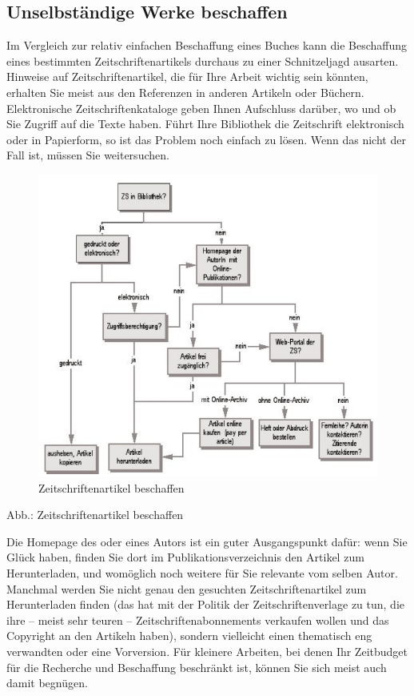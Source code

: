 \documentclass[]{book}
\theoremstyle{definition}
\theoremstyle{definition}
\theoremstyle{definition}
\theoremstyle{remark}
\begin{document}
\subsection{Unselbständige Werke
beschaffen}\label{unselbstandige-werke-beschaffen}

Im Vergleich zur relativ einfachen Beschaffung eines Buches kann die
Beschaffung eines bestimmten Zeitschriftenartikels durchaus zu einer
Schnitzeljagd ausarten. Hinweise auf Zeitschriftenartikel, die für Ihre
Arbeit wichtig sein könnten, erhalten Sie meist aus den Referenzen in
anderen Artikeln oder Büchern. Elektronische Zeitschriftenkataloge geben
Ihnen Aufschluss darüber, wo und ob Sie Zugriff auf die Texte haben.
Führt Ihre Bibliothek die Zeitschrift elektronisch oder in Papierform,
so ist das Problem noch einfach zu lösen. Wenn das nicht der Fall ist,
müssen Sie weitersuchen.

\begin{figure}

{\centering \includegraphics{images/recherchieren-zeitschriften-beschaffen-min} 

}

\caption{Zeitschriftenartikel beschaffen}\label{fig:unnamed-chunk-10}
\end{figure}

Abb.: Zeitschriftenartikel beschaffen

Die Homepage des oder eines Autors ist ein guter Ausgangspunkt dafür:
wenn Sie Glück haben, finden Sie dort im Publikationsverzeichnis den
Artikel zum Herunterladen, und womöglich noch weitere für Sie relevante
vom selben Autor. Manchmal werden Sie nicht genau den gesuchten
Zeitschriftenartikel zum Herunterladen finden (das hat mit der Politik
der Zeitschriftenverlage zu tun, die ihre -- meist sehr teuren --
Zeitschriftenabonnements verkaufen wollen und das Copyright an den
Artikeln haben), sondern vielleicht einen thematisch eng verwandten oder
eine Vorversion. Für kleinere Arbeiten, bei denen Ihr Zeitbudget für die
Recherche und Beschaffung beschränkt ist, können Sie sich meist auch
damit begnügen.
\end{document}
